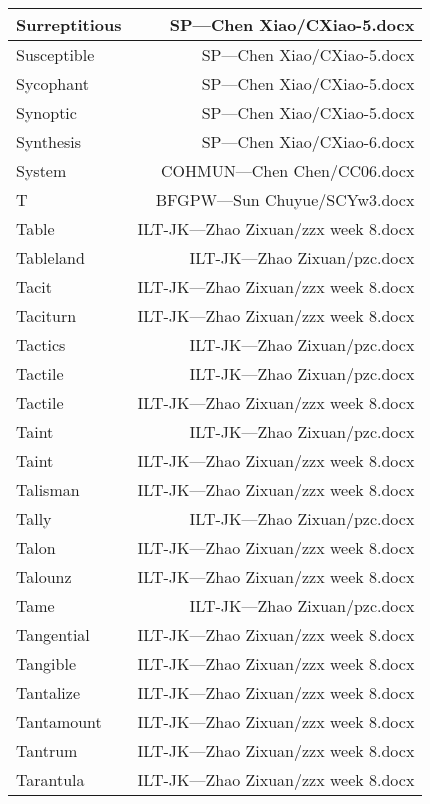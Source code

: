 \documentclass{article}
\begin{document}
\begin{center}
\begin{longtable}{|l|r|}
\hline
Surreptitious  &  SP---Chen Xiao/CXiao-5.docx\\  
\hline
Susceptible  &  SP---Chen Xiao/CXiao-5.docx\\  
\hline
Sycophant  &  SP---Chen Xiao/CXiao-5.docx\\  
\hline
Synoptic  &  SP---Chen Xiao/CXiao-5.docx\\  
\hline
Synthesis  &  SP---Chen Xiao/CXiao-6.docx\\  
\hline
System  &  COHMUN---Chen Chen/CC06.docx\\  
\hline
T  &  BFGPW---Sun Chuyue/SCYw3.docx\\  
\hline
Table  &  ILT-JK---Zhao Zixuan/zzx week 8.docx\\  
\hline
Tableland  &  ILT-JK---Zhao Zixuan/pzc.docx\\  
\hline
Tacit  &  ILT-JK---Zhao Zixuan/zzx week 8.docx\\  
\hline
Taciturn  &  ILT-JK---Zhao Zixuan/zzx week 8.docx\\  
\hline
Tactics  &  ILT-JK---Zhao Zixuan/pzc.docx\\  
\hline
Tactile  &  ILT-JK---Zhao Zixuan/pzc.docx\\  
\hline
Tactile  &  ILT-JK---Zhao Zixuan/zzx week 8.docx\\  
\hline
Taint  &  ILT-JK---Zhao Zixuan/pzc.docx\\  
\hline
Taint  &  ILT-JK---Zhao Zixuan/zzx week 8.docx\\  
\hline
Talisman  &  ILT-JK---Zhao Zixuan/zzx week 8.docx\\  
\hline
Tally  &  ILT-JK---Zhao Zixuan/pzc.docx\\  
\hline
Talon  &  ILT-JK---Zhao Zixuan/zzx week 8.docx\\  
\hline
Talounz  &  ILT-JK---Zhao Zixuan/zzx week 8.docx\\  
\hline
Tame  &  ILT-JK---Zhao Zixuan/pzc.docx\\  
\hline
Tangential  &  ILT-JK---Zhao Zixuan/zzx week 8.docx\\  
\hline
Tangible  &  ILT-JK---Zhao Zixuan/zzx week 8.docx\\  
\hline
Tantalize  &  ILT-JK---Zhao Zixuan/zzx week 8.docx\\  
\hline
Tantamount  &  ILT-JK---Zhao Zixuan/zzx week 8.docx\\  
\hline
Tantrum  &  ILT-JK---Zhao Zixuan/zzx week 8.docx\\  
\hline
Tarantula  &  ILT-JK---Zhao Zixuan/zzx week 8.docx\\  

\end{longtable}
\end{center}
\end{document}
